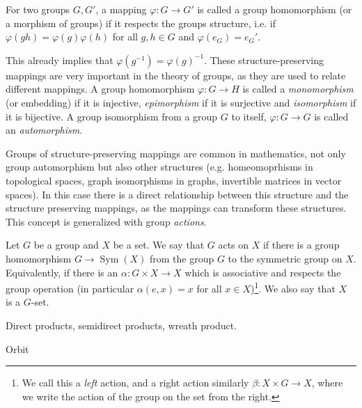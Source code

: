 \begin{defn}
For two groups $G, G'$, a mapping $\varphi : G \rightarrow G'$ is called a group homomorphism (or a morphism of groups) if it respects the groups structure, i.e. 
if $\varphi(gh) = \varphi(g) \varphi(h)$ for all $g,h \in G$ and $\varphi(e_G) = e_G'$. 
\end{defn}
This already implies that $\varphi(g^{-1}) = \varphi(g)^{-1}$.
These structure-preserving mappings are very important in the theory of groups, as they are used to relate different mappings. 
A group homomorphism $\varphi : G \rightarrow H$ is called a \emph{monomorphism} (or embedding) if it is injective, \emph{epimorphism} if it is surjective and \emph{isomorphism} if it is bijective.
A group isomorphism from a group $G$ to itself, $\varphi : G \rightarrow G$ is called an \emph{automorphism}.

Groups of structure-preserving mappings are common in mathematics, not only group automorphism but also other structures (e.g. homeomoprhisms in topological spaces, graph isomorphisms in graphs, invertible matrices in vector spaces).
In this case there is a direct relationship between this structure and the structure preserving mappings, as the mappings can transform these structures.
This concept is generalized with group \emph{actions}. 
\begin{defn}
    Let $G$ be a group and $X$ be a set.
We say that $G$ acts on $X$ if there is a group homomorphism $G \rightarrow \operatorname{Sym}(X)$ from the group $G$ to the symmetric group on $X$. 
Equivalently, if there is an $\alpha : G \times X \rightarrow X$ which is associative and respects the group operation (in particular $\alpha(e,x) = x$ for all $x \in X$)\footnote{We
call this a \emph{left} action, and a right action similarly $\beta  : X \times G \rightarrow X$, where we write the action of the group on the set from the right.}. 
We also say that $X$ is a $G$-set.
\end{defn}

Direct products, semidirect products, wreath product.

Orbit
